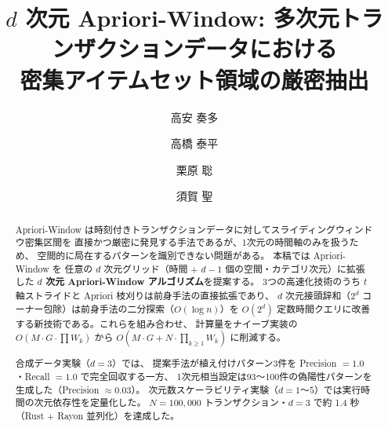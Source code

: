 \documentclass[runningheads,a4paper]{llncs}
\begin{document}
\title{$d$ 次元 Apriori-Window: 多次元トランザクションデータにおける\\
密集アイテムセット領域の厳密抽出}

\author{高安 奏多 \and 高橋 泰平 \and 栗原 聡 \and 須賀 聖}


\maketitle

\begin{abstract}
Apriori-Window は時刻付きトランザクションデータに対してスライディングウィンドウ密集区間を
直接かつ厳密に発見する手法であるが、1次元の時間軸のみを扱うため、
空間的に局在するパターンを識別できない問題がある。
本稿では Apriori-Window を
任意の $d$ 次元グリッド（時間 + $d{-}1$ 個の空間・カテゴリ次元）に拡張した
\textbf{$d$ 次元 Apriori-Window アルゴリズム}を提案する。
3つの高速化技術のうち $t$ 軸ストライドと Apriori 枝刈りは前身手法の直接拡張であり、
$d$ 次元接頭辞和（$2^d$ コーナー包除）は前身手法の二分探索（$O(\log n)$）を
$O(2^d)$ 定数時間クエリに改善する新技術である。これらを組み合わせ、
計算量をナイーブ実装の $O\!\left(M \cdot G \cdot \prod W_k\right)$ から
$O\!\left(M \cdot G + N \cdot \prod_{k\geq1} W_k\right)$ に削減する。

合成データ実験（$d{=}3$）では、
提案手法が植え付けパターン3件を Precision $= 1.0$・Recall $= 1.0$ で完全回収する一方、
1次元相当設定は93〜100件の偽陽性パターンを生成した（Precision $\approx 0.03$）。
次元数スケーラビリティ実験（$d{=}1$〜$5$）では実行時間の次元依存性を定量化した。
$N = 100{,}000$ トランザクション・$d{=}3$ で約 1.4 秒（Rust + Rayon 並列化）を達成した。
\end{abstract}











\end{document}
